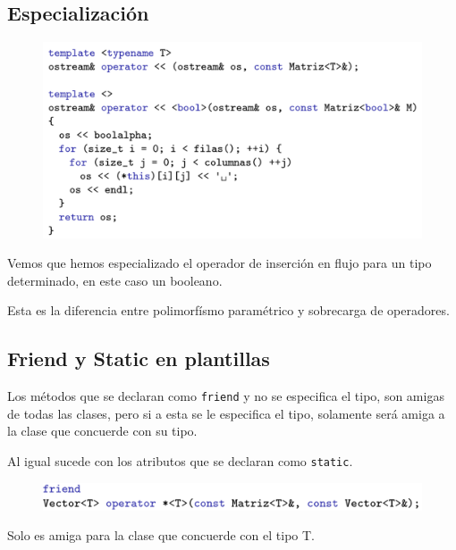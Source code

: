 \subsection{Especialización}
\begin{figure}[h]
	\begin{center}
		\includegraphics[width=\textwidth]{Imagenes/poli13.png}
	\end{center}
\end{figure}

Vemos que hemos especializado el operador de inserción en flujo para un tipo determinado, en este caso un booleano.

Esta es la diferencia entre polimorfísmo paramétrico y sobrecarga de operadores.

\subsection{Friend y Static en plantillas}
Los métodos que se declaran como \texttt{friend} y no se especifica el tipo, son amigas de todas las clases, pero si a esta se le especifica el tipo, solamente será amiga a la clase que concuerde con su tipo.

Al igual sucede con los atributos que se declaran como \texttt{static}.
\begin{figure}[h]
	\begin{center}
		\includegraphics[width=\textwidth]{Imagenes/poli14.png}
	\end{center}
\end{figure}

Solo es amiga para la clase que concuerde con el tipo T.
















